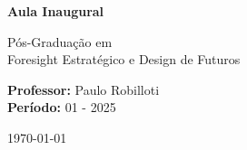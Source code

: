 \begin{titlepage}
    \centering
    \vspace*{2cm}
    
    {\Huge\bfseries\sffamily\color{primary_espm}
    Aula Inaugural\\[0.5cm]}
    
    \vspace{1.5cm}
    
    {\Large\sffamily\color{darkgray}
    Pós-Graduação em\\ Foresight Estratégico e Design de Futuros}
    
    \vspace{2cm}
    
    
    \vspace{2cm}
    
    {\large\sffamily

    \textbf{Professor:} Paulo Robilloti\\[0.5cm]
    \textbf{Período:} 01 - 2025}
    
    \vfill
    
    {\large\sffamily\color{darkgray}
    \today}
    
\end{titlepage}

\tableofcontents
\newpage

\sectionbreak